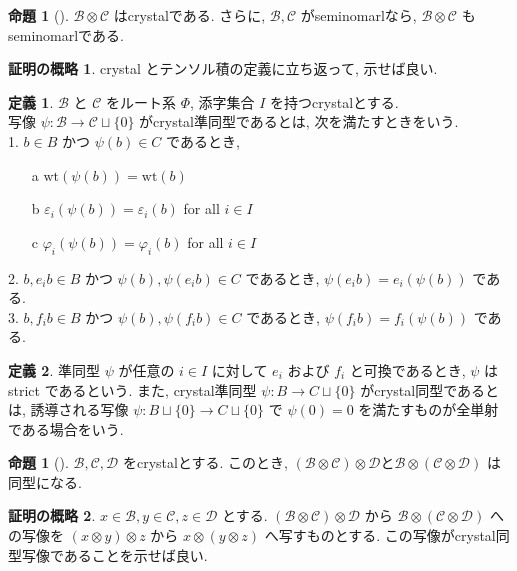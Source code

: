 \documentclass[
  a4paper, 
  12pt,
  ja=standard,
  xelatex,
  left=30truemm,
  right=30truemm,
  titlepage 
]{bxjsarticle}
\theoremstyle{definition}
\newtheorem{df}{定義}
\newtheorem{prop}[thm]{命題}
\newtheorem*{prf}{証明の概略}
\begin{document}
\begin{prop}[{\cite[命題2.29]{b1}}]
  $\mathscr{B} \otimes \mathscr{C}$ はcrystalである. さらに, $\mathscr{B}, \mathscr{C}$ がseminomarlなら, $\mathscr{B} \otimes \mathscr{C}$ もseminomarlである. 
\end{prop}

\begin{prf}
  crystal とテンソル積の定義に立ち返って, 示せば良い.
\end{prf}

\begin{df}  
  $\mathscr{B}$ と $\mathscr{C}$ をルート系 $\Phi$, 添字集合 $I$ を持つcrystalとする. \\
  写像 $ \psi : \mathscr{B} \to \mathscr{C} \sqcup \{ 0 \}$ がcrystal準同型であるとは, 次を満たすときをいう. \\
  1. $b \in B$ かつ $\psi(b) \in C$ であるとき, 
    \begin{enumerate}
      \item[a] $\mathrm{wt}(\psi(b)) = \mathrm{wt}(b)$
      \item[b] $\varepsilon_i(\psi(b)) = \varepsilon_i(b)$ \quad for all $i \in I$
      \item[c] $\varphi_i(\psi(b)) = \varphi_i(b)$ \quad for all $i \in I$
    \end{enumerate}
  2. $b, e_i b \in B$ かつ $\psi(b), \psi(e_i b) \in C$ であるとき, $\psi(e_i b) = e_i(\psi(b))$ である. \\
  3. $b, f_i b \in B$ かつ $\psi(b), \psi(f_i b) \in C$ であるとき, $\psi(f_i b) = f_i(\psi(b))$ である.
\end{df}

\begin{df}
  準同型 $\psi$ が任意の $i \in I$ に対して $e_i$ および $f_i$ と可換であるとき, $\psi$ は strict であるという.
  また, crystal準同型 $\psi : B \to C \sqcup \{ 0 \}$ がcrystal同型であるとは, 誘導される写像 $\psi : B \sqcup \{ 0 \} \to C \sqcup \{ 0 \}$ で $\psi(0) = 0$ を満たすものが全単射である場合をいう.
\end{df}

\begin{prop} [{\cite[命題2.32]{b1}}] 
  $\mathscr{B}, \mathscr{C}, \mathscr{D}$ をcrystalとする.
  このとき, $(\mathscr{B} \otimes \mathscr{C}) \otimes \mathscr{D}$と$\mathscr{B} \otimes (\mathscr{C} \otimes \mathscr{D})$ は同型になる. 
\end{prop}

\begin{prf}
  $x \in \mathscr{B}, y \in \mathscr{C}, z \in \mathscr{D}$ とする. 
  $(\mathscr{B} \otimes \mathscr{C}) \otimes \mathscr{D}$ から $\mathscr{B} \otimes (\mathscr{C} \otimes \mathscr{D})$ への写像を
  $( x \otimes y) \otimes z$ から $ x \otimes ( y \otimes z)$ へ写すものとする. 
  この写像がcrystal同型写像であることを示せば良い.
\end{prf}
\end{document}
